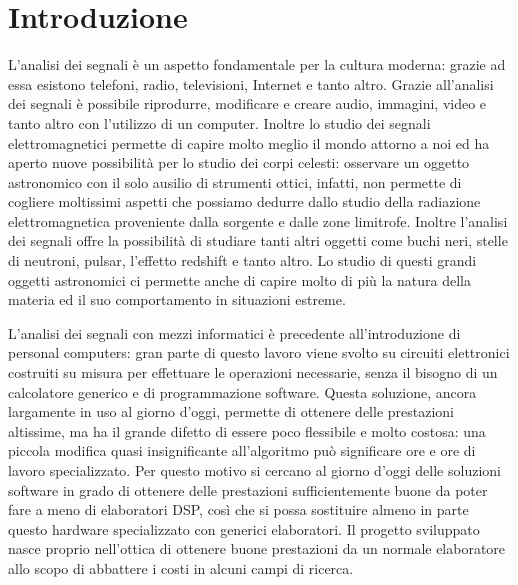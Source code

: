 \chapter*{Introduzione}
\label{intro}

L'analisi dei segnali \`e un aspetto fondamentale per la cultura moderna: grazie
ad essa esistono telefoni, radio, televisioni, Internet e tanto altro. Grazie
all'analisi dei segnali \`e possibile riprodurre, modificare e creare audio,
immagini, video e tanto altro con l'utilizzo di un computer. Inoltre lo studio
dei segnali elettromagnetici permette di capire molto meglio il mondo attorno a
noi ed ha aperto nuove possibilit\`a per lo studio dei corpi celesti: osservare
un oggetto astronomico con il solo ausilio di strumenti ottici, infatti, non
permette di cogliere moltissimi aspetti che possiamo dedurre dallo studio della
radiazione elettromagnetica proveniente dalla sorgente e dalle zone limitrofe.
Inoltre l'analisi dei segnali offre la possibilit\`a di studiare tanti altri
oggetti come buchi neri, stelle di neutroni, pulsar, l'effetto redshift e tanto
altro. Lo studio di questi grandi oggetti astronomici ci permette anche di
capire molto di pi\`u la natura della materia ed il suo comportamento in
situazioni estreme.

L'analisi dei segnali con mezzi informatici \`e precedente all'introduzione di
personal computers: gran parte di questo lavoro viene svolto su circuiti
elettronici costruiti su misura per effettuare le operazioni necessarie, senza
il bisogno di un calcolatore generico e di programmazione software. Questa
soluzione, ancora largamente in uso al giorno d'oggi, permette di ottenere delle
prestazioni altissime, ma ha il grande difetto di essere poco flessibile e molto
costosa: una piccola modifica quasi insignificante all'algoritmo pu\`o
significare ore e ore di lavoro specializzato. Per questo motivo si cercano al
giorno d'oggi delle soluzioni software in grado di ottenere delle prestazioni
sufficientemente buone da poter fare a meno di elaboratori DSP, cos\`i che si
possa sostituire almeno in parte questo hardware specializzato con generici
elaboratori. Il progetto sviluppato nasce proprio nell'ottica di ottenere buone
prestazioni da un normale elaboratore allo scopo di abbattere i costi in alcuni
campi di ricerca.
